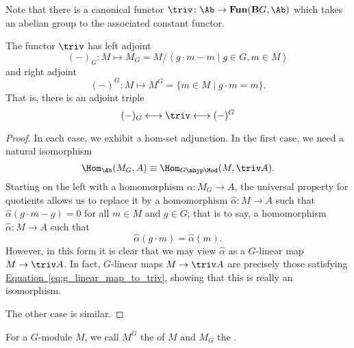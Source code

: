 \documentclass[main.tex]{subfiles}
\begin{document}
Note that there is a canonical functor $\triv\colon \Ab \to \mathbf{Fun}(\mathbf{B}G, \Ab)$ which takes an abelian group to the associated constant functor.
\begin{proposition}
  The functor $\triv$ has left adjoint
  \begin{equation*}
    (-)_{G}\colon M \mapsto M_{G} = M/\left\langle g\cdot m - m \mid g \in G, m \in M \right\rangle
  \end{equation*}
  and right adjoint
  \begin{equation*}
    (-)^{G}\colon M \mapsto M^{G} = \{m \in M \mid g\cdot m = m\}.
  \end{equation*}
  That is, there is an adjoint triple
  \begin{equation*}
    (-)_{G} \longleftrightarrow \triv \longleftrightarrow (-)^{G}
  \end{equation*}
\end{proposition}
\begin{proof}
  In each case, we exhibit a hom-set adjunction. In the first case, we need a natural isomorphism
  \begin{equation*}
    \Hom_{\Ab}(M_{G}, A) \equiv \Hom_{G\mhyp\Mod}(M, \triv A).
  \end{equation*}
  Starting on the left with a homomorphism $\alpha\colon M_{G} \to A$, the universal property for quotients allows us to replace it by a homomorphism $\hat{\alpha}\colon M \to A$ such that $\hat{\alpha}(g\cdot m - g) = 0$ for all $m \in M$ and $g \in G$; that is to say, a homomorphism $\hat{\alpha}\colon M \to A$ such that
  \begin{equation}
    \label{eq:g_linear_map_to_triv}
    \hat{\alpha}(g\cdot m) = \hat{\alpha}(m).
  \end{equation}
  However, in this form it is clear that we may view $\hat{\alpha}$ as a $G$-linear map $M \to \triv A$. In fact, $G$-linear maps $M \to \triv A$ are precisely those satisfying \hyperref[eq:g_linear_map_to_triv]{Equation~\ref*{eq:g_linear_map_to_triv}}, showing that this is really an isomorphism.

  The other case is similar.
\end{proof}

\begin{definition}
  \label{def:invariants_coinvariants}
  For a $G$-module $M$, we call $M^{G}$ the  of $M$ and $M_{G}$ the .
\end{definition}
\end{document}
